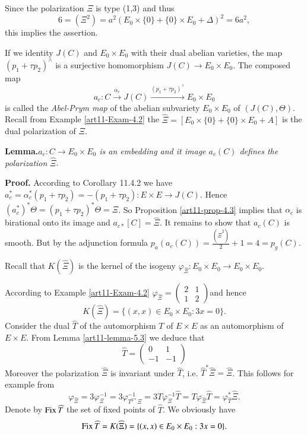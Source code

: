 Since the polarization $\Xi$ is type (1,3) and thus
$$
6 = (\Xi^{2}) =a^{2}(E_{0}\times \{0\} + \{0\} \times E_{0} + \Delta)^{2}=6a^{2},
$$
this implies the assertion.

If we identity $J(C)$ and $E_{0}\times E_{0}$ with their dual abelian varieties, the map $(p_{1} + \tau p_{2})^{\wedge}$ is a surjective homomorphism $J(C) \rightarrow E_{0}\times E_{0}$. The composed map
$$
a_{c}: C\xrightarrow{\alpha_{c}} J(C)\xrightarrow{(p_{1}+ \tau p_{2})^{\wedge}}E_{0} \times E_{0}
$$
is called the \textit{Abel-Prym map} of the abelian subvariety $E_{0}\times E_{0}$ of $(J(C), \Theta)$. Recall from Example \ref{art11-Exam-4.2} the $\widehat{\Xi} = [E_{0}\times \{0\} + \{0\} \times E_{0} + A]$ is the dual polarization of $\Xi$.

\medskip
\noindent
{\bfseries {} Lemma.\label{art11-lemma-5.5}}\textit{$a_{c}: C\rightarrow E_{0}\times E_{0}$ is an embedding and it image $a_{c}(C)$ defines the polarization} $\widehat{\Xi}$.

\medskip
\noindent
{\bfseries Proof.} According to \cite{art11-keyL-B} Corollary 11.4.2 we have $a_{c}^{*} =\alpha_{c}^{*}(p_{1} + \tau p_{2})=-(p_{1} + \tau p_{2}): E\times E \rightarrow J(C)$. Hence $(a_{c}^{*})^{*}\Theta = (p_{1} + \tau p_{2})^{*}\Theta = \Xi$. So Proposition \ref{art11-prop-4.3} implies that $\alpha_{c}$ is birational onto its image and $a_{c*}[C]=\widehat{\Xi}$. It remains to show that $a_{c}(C)$ is smooth. But by the adjunction formula $p_{a}(a_{c}(C)) =\frac{(\widehat{\Xi}^{2})}{2} + 1 =4 = p_{g}(C)$.

Recall that $K (\widehat{\Xi})$ is the kernel of the isogeny $\varphi_{\widehat{\Xi}}: E_{0} \times E_{0} \rightarrow E_{0} \times E_{0}$.

According to Example \ref{art11-Exam-4.2}
$\varphi_{\widehat{\Xi}}= \begin{pmatrix}
2 & 1\\
1 & 2
\end{pmatrix}
$and hence
$$
K(\widehat{\Xi}) = \{(x,x) \in E_{0} \times E_{0}: 3x =0\}.
$$
Consider the dual $\widehat{T}$ of the automorphism $T$ of $E \times E$ as an automorphism
of  $ E\times E$. From Lemma \ref{art11-lemma-5.3} we deduce that
$$
\widehat{T}=\begin{pmatrix}
0 & 1\\
-1 & -1
\end{pmatrix}
$$
Moreover the polarization $\widehat{\Xi}$ is invariant under $\widehat{T}$, i.e. $\widehat{T}^{*}\widehat{\Xi} = \widehat{\Xi}$. This follows for example from
$$
\varphi_{\widehat{\Xi}} =3 \varphi_{\Xi}^{-1} = 3\varphi_{T^{2*}\Xi}^{-1} = 3 T\varphi_{\Xi}^{-1}\widehat{T}= T \varphi_{\widehat{\Xi}}\widehat{T} = \varphi_{\widehat{T}}^{*} \widehat{\Xi}.
$$
Denote by $\operatorname{Fix}\widehat{T}$ the set of fixed points of $\widehat{T}$. We obviously have
$$
\operatorname{Fix}\widehat{T}=K(\widehat{\Xi}) = \{(x,x) \in E_{0} \times E_{0}: 3x =0\}.
$$ 

